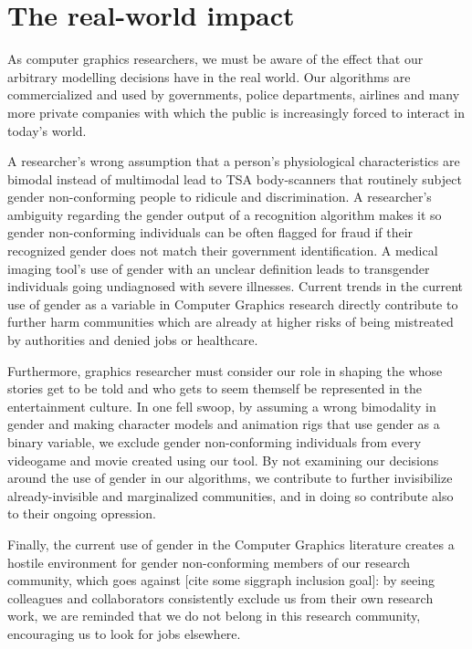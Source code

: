 \documentclass[acmtog,nonacm,review,balance=false]{acmart}
\begin{document}
\section{The real-world impact}

As computer graphics researchers, we must be aware of the effect that our
arbitrary modelling decisions have in the real world. Our algorithms are
commercialized and used by governments, police departments, airlines and many
more private companies with which the public is increasingly forced to interact
in today's world.

A researcher's wrong assumption that a person's physiological characteristics
are bimodal instead of multimodal lead to TSA body-scanners that routinely
subject gender non-conforming people to ridicule and discrimination. A
researcher's ambiguity regarding the gender output of a recognition algorithm
makes it so gender non-conforming individuals can be often flagged for fraud if
their recognized gender does not match their government identification. A
medical imaging tool's use of gender with an unclear definition leads to
transgender individuals going undiagnosed with severe illnesses. Current trends
in the current use of gender as a variable in Computer Graphics research
directly contribute to further harm communities which are already at higher
risks of being mistreated by authorities and denied jobs or healthcare. 

Furthermore, graphics researcher must consider our role in shaping the whose
stories get to be told and who gets to seem themself be represented in the
entertainment culture. In one fell swoop, by assuming a wrong bimodality in
gender and making character models and animation rigs that use gender as a
binary variable, we exclude gender non-conforming individuals from every
videogame and movie created using our tool. By not examining our decisions
around the use of gender in our algorithms, we contribute to further
invisibilize already-invisible and marginalized communities, and in doing so
contribute also to their ongoing opression.

Finally, the current use of gender in the Computer Graphics literature creates a
hostile environment for gender non-conforming members of our research community,
which goes against [cite some siggraph inclusion goal]: by seeing colleagues and
collaborators consistently exclude us from their own research work, we are
reminded that we do not belong in this research community, encouraging us to
look for jobs elsewhere.
\end{document}
